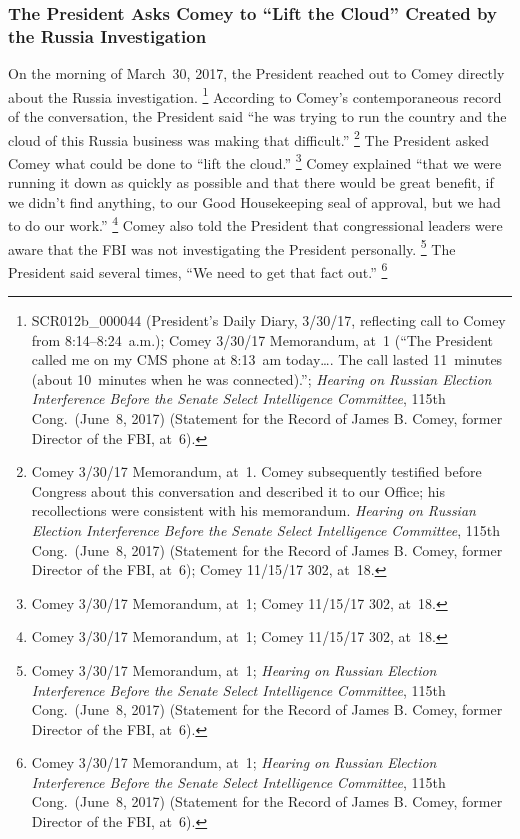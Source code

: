 \subsubsection{The President Asks Comey to ``Lift the Cloud'' Created by the Russia Investigation}

On the morning of March~30, 2017, the President reached out to Comey directly about the Russia investigation.%
\footnote{SCR012b\_000044 (President's Daily Diary, 3/30/17, reflecting call to Comey from 8:14--8:24~a.m.);
Comey 3/30/17 Memorandum, at~1 (``The President called me on my CMS phone at 8:13~am today\dots.
The call lasted 11~minutes (about 10~minutes when he was connected).'';
\textit{Hearing on Russian Election Interference Before the Senate Select Intelligence Committee}, 115th Cong.\ (June~8, 2017) (Statement for the Record of James B. Comey, former Director of the FBI, at~6).}
According to Comey's contemporaneous record of the conversation, the President said ``he was trying to run the country and the cloud of this Russia business was making that difficult.''%
\footnote{Comey 3/30/17 Memorandum, at~1.
Comey subsequently testified before Congress about this conversation and described it to our Office;
his recollections were consistent with his memorandum.
\textit{Hearing on Russian Election Interference Before the Senate Select Intelligence Committee}, 115th Cong.\ (June~8, 2017) (Statement for the Record of James B. Comey, former Director of the FBI, at~6);
Comey 11/15/17 302, at~18.}
The President asked Comey what could be done to ``lift the cloud.''%
\footnote{Comey 3/30/17 Memorandum, at~1;
Comey 11/15/17 302, at~18.}
Comey explained ``that we were running it down as quickly as possible and that there would be great benefit, if we didn't find anything, to our Good Housekeeping seal of approval, but we had to do our work.''%
\footnote{Comey 3/30/17 Memorandum, at~1;
Comey 11/15/17 302, at~18.}
Comey also told the President that congressional leaders were aware that the FBI was not investigating the President personally.%
\footnote{Comey 3/30/17 Memorandum, at~1;
\textit{Hearing on Russian Election Interference Before the Senate Select Intelligence Committee}, 115th Cong.\ (June~8, 2017) (Statement for the Record of James B. Comey, former Director of the FBI, at~6).}
The President said several times, ``We need to get that fact out.''%
\footnote{Comey 3/30/17 Memorandum, at~1;
\textit{Hearing on Russian Election Interference Before the Senate Select Intelligence Committee}, 115th Cong.\ (June~8, 2017) (Statement for the Record of James B. Comey, former Director of the FBI, at~6).}
